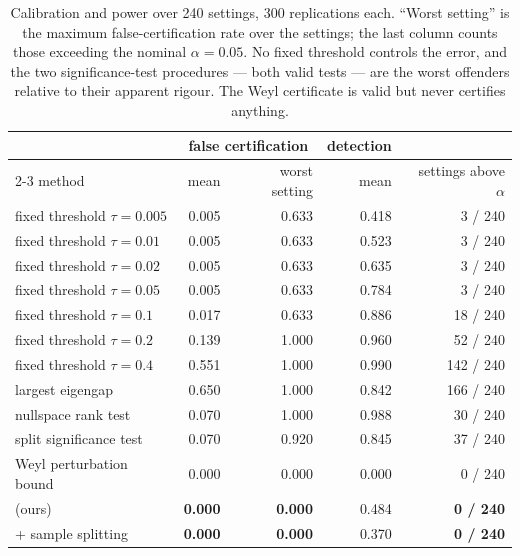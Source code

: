 \begin{table}[t]
\centering\small
\begin{tabular}{lrrrr}
\toprule
& \multicolumn{2}{c}{false certification} & detection & \\
\cmidrule(lr){2-3}
method & mean & worst setting & mean & settings above $\alpha$ \\
\midrule
fixed threshold $\tau=0.005$ & 0.005 & 0.633 & 0.418 & 3 / 240 \\
fixed threshold $\tau=0.01$ & 0.005 & 0.633 & 0.523 & 3 / 240 \\
fixed threshold $\tau=0.02$ & 0.005 & 0.633 & 0.635 & 3 / 240 \\
fixed threshold $\tau=0.05$ & 0.005 & 0.633 & 0.784 & 3 / 240 \\
fixed threshold $\tau=0.1$ & 0.017 & 0.633 & 0.886 & 18 / 240 \\
fixed threshold $\tau=0.2$ & 0.139 & 1.000 & 0.960 & 52 / 240 \\
fixed threshold $\tau=0.4$ & 0.551 & 1.000 & 0.990 & 142 / 240 \\
largest eigengap & 0.650 & 1.000 & 0.842 & 166 / 240 \\
nullspace rank test & 0.070 & 1.000 & 0.988 & 30 / 240 \\
split significance test & 0.070 & 0.920 & 0.845 & 37 / 240 \\
Weyl perturbation bound & 0.000 & 0.000 & 0.000 & 0 / 240 \\
\midrule
\symcert{} (ours) & \textbf{0.000} & \textbf{0.000} & 0.484 & \textbf{0 / 240} \\
\symcert{} + sample splitting & \textbf{0.000} & \textbf{0.000} & 0.370 & \textbf{0 / 240} \\
\bottomrule
\end{tabular}
\caption{Calibration and power over 240 settings, 300 replications each. ``Worst setting'' is the
maximum false-certification rate over the settings; the last column counts those
exceeding the nominal $\alpha = 0.05$. No fixed threshold controls the error,
and the two significance-test procedures --- both valid tests --- are the worst
offenders relative to their apparent rigour. The Weyl certificate is valid but
never certifies anything.}
\label{tab:calibration}
\end{table}
